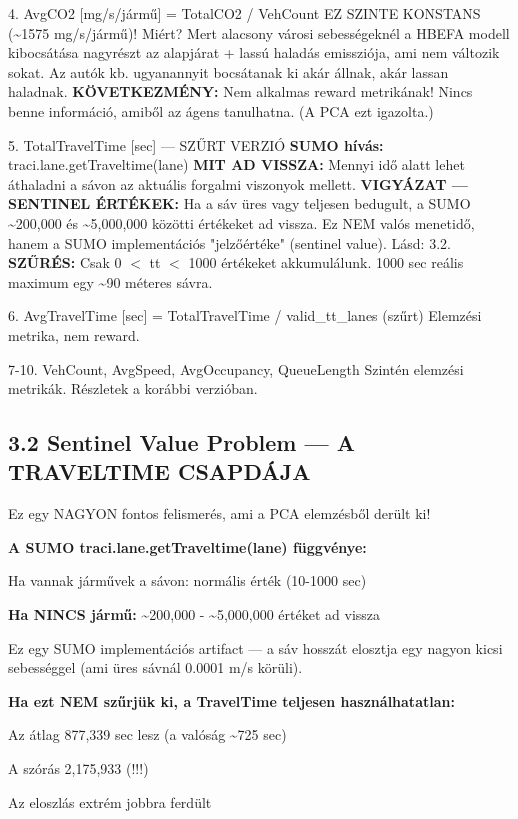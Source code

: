 \documentclass[11pt,a4paper]{article}
\begin{document}
4. AvgCO2 [mg/s/jármű]
= TotalCO2 / VehCount
EZ SZINTE KONSTANS (\textasciitilde{}1575 mg/s/jármű)!
Miért? Mert alacsony városi sebességeknél a HBEFA modell
kibocsátása nagyrészt az alapjárat + lassú haladás emissziója,
ami nem változik sokat. Az autók kb. ugyanannyit bocsátanak ki
akár állnak, akár lassan haladnak.
\textbf{KÖVETKEZMÉNY:} Nem alkalmas reward metrikának! Nincs benne
információ, amiből az ágens tanulhatna. (A PCA ezt igazolta.)

5. TotalTravelTime [sec] — SZŰRT VERZIÓ
\textbf{SUMO hívás:} traci.lane.getTraveltime(lane)
\textbf{MIT AD VISSZA:} Mennyi idő alatt lehet áthaladni a sávon
az aktuális forgalmi viszonyok mellett.
\textbf{VIGYÁZAT — SENTINEL ÉRTÉKEK:} Ha a sáv üres vagy teljesen
bedugult, a SUMO \textasciitilde{}200,000 és \textasciitilde{}5,000,000 közötti értékeket
ad vissza. Ez NEM valós menetidő, hanem a SUMO implementációs
"jelzőértéke" (sentinel value). Lásd: 3.2.
\textbf{SZŰRÉS:} Csak 0 $<$ tt $<$ 1000 értékeket akkumulálunk.
1000 sec reális maximum egy \textasciitilde{}90 méteres sávra.

6. AvgTravelTime [sec]
= TotalTravelTime / valid\_tt\_lanes (szűrt)
Elemzési metrika, nem reward.

7-10. VehCount, AvgSpeed, AvgOccupancy, QueueLength
Szintén elemzési metrikák. Részletek a korábbi verzióban.

\subsection*{3.2 Sentinel Value Problem — A TRAVELTIME CSAPDÁJA}
Ez egy NAGYON fontos felismerés, ami a PCA elemzésből derült ki!

\textbf{A SUMO traci.lane.getTraveltime(lane) függvénye:}
\par\noindent\hspace*{1em}\textbullet{} Ha vannak járművek a sávon: normális érték (10-1000 sec)
\par\noindent\hspace*{1em}\textbullet{} \textbf{Ha NINCS jármű:} \textasciitilde{}200,000 - \textasciitilde{}5,000,000 értéket ad vissza

Ez egy SUMO implementációs artifact — a sáv hosszát elosztja
egy nagyon kicsi sebességgel (ami üres sávnál 0.0001 m/s körüli).

\textbf{Ha ezt NEM szűrjük ki, a TravelTime teljesen használhatatlan:}
\par\noindent\hspace*{1em}\textbullet{} Az átlag 877,339 sec lesz (a valóság \textasciitilde{}725 sec)
\par\noindent\hspace*{1em}\textbullet{} A szórás 2,175,933 (!!!)
\par\noindent\hspace*{1em}\textbullet{} Az eloszlás extrém jobbra ferdült
\end{document}
